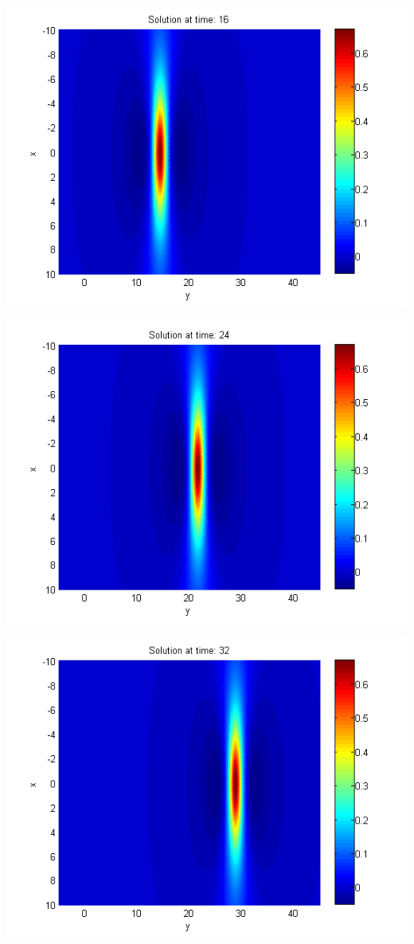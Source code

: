 \documentclass[a0,portrait]{a0poster}
\begin{document}
\begin{multicols}{2}
\begin{center}
\begin{minipage}[b]{0.30\linewidth}
		 \includegraphics[width=\linewidth]{figures/Solution1_t=16.png}
	\end{minipage}
	\begin{minipage}[b]{0.30\linewidth}
		\includegraphics[width=\linewidth]{figures/Solution1_t=24.png}
	\end{minipage}	
	\begin{minipage}[b]{0.30\linewidth}
		 \includegraphics[width=\linewidth]{figures/Solution1_t=32.png}

\end{minipage}
\end{center}
\end{multicols}
\end{document}
